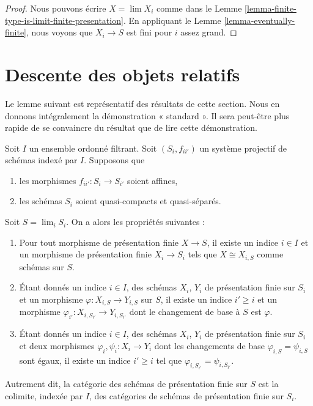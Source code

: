 \begin{proof}
Nous pouvons écrire $X = \lim X_i$ comme dans le
Lemme \ref{lemma-finite-type-is-limit-finite-presentation}. En appliquant le
Lemme \ref{lemma-eventually-finite}, nous voyons que $X_i \to S$ est fini
pour $i$ assez grand.
\end{proof}








\section{Descente des objets relatifs}
\label{section-descending-relative}

\noindent
Le lemme suivant est représentatif des résultats de cette section.
Nous en donnons intégralement la démonstration « standard ». Il sera
peut-être plus rapide de se convaincre du résultat que de lire cette démonstration.

\begin{lemma}
\label{lemma-descend-finite-presentation}
Soit $I$ un ensemble ordonné filtrant.
Soit $(S_i, f_{ii'})$ un système projectif de schémas indexé par $I$.
Supposons que
\begin{enumerate}
\item les morphismes $f_{ii'} : S_i \to S_{i'}$ soient affines,
\item les schémas $S_i$ soient quasi-compacts et quasi-séparés.
\end{enumerate}
Soit $S = \lim_i S_i$. On a alors les propriétés suivantes :
\begin{enumerate}
\item Pour tout morphisme de présentation finie $X \to S$,
il existe un indice $i \in I$ et un morphisme de présentation finie
$X_i \to S_i$ tels que $X \cong X_{i, S}$ comme schémas sur $S$.
\item Étant donnés un indice $i \in I$, des schémas
$X_i$, $Y_i$ de présentation finie sur $S_i$ et un morphisme
$\varphi : X_{i, S} \to Y_{i, S}$ sur $S$, il existe un indice
$i' \geq i$ et un morphisme
$\varphi_{i'} : X_{i, S_{i'}} \to Y_{i, S_{i'}}$
dont le changement de base à $S$ est $\varphi$.
\item Étant donnés un indice $i \in I$, des schémas $X_i$, $Y_i$
de présentation finie sur $S_i$ et deux morphismes
$\varphi_i, \psi_i : X_i \to Y_i$
dont les changements de base $\varphi_{i, S} = \psi_{i, S}$ sont égaux,
il existe un indice $i' \geq i$ tel que
$\varphi_{i, S_{i'}} = \psi_{i, S_{i'}}$.
\end{enumerate}
Autrement dit, la catégorie des schémas de présentation finie sur
$S$ est la colimite, indexée par $I$, des catégories de schémas de
présentation finie sur $S_i$.
\end{lemma}

